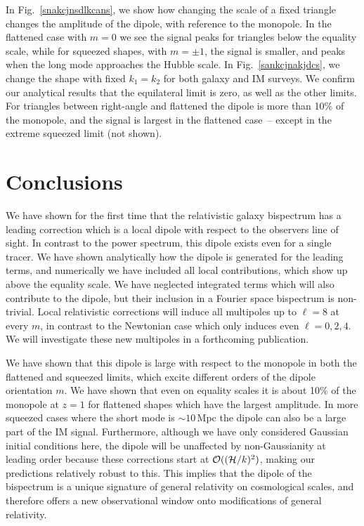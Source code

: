 In Fig.~\eqref{snakcjnsdlkcans}, we show how changing the scale of a fixed triangle changes the amplitude of the dipole, with reference to the monopole. In the flattened case with $m=0$ we see the signal peaks for triangles below the equality scale, while for squeezed shapes, with $m=\pm1$, the signal is smaller, and peaks when the long mode approaches the Hubble scale. 
In Fig.~\eqref{sankcjnakjdcs}, we change the shape with fixed $k_1=k_2$ for both galaxy and IM surveys. We confirm our analytical results that the equilateral limit is zero, as well as the other limits. For triangles between right-angle and flattened the dipole is more than 10\% of the monopole, and the signal is largest in the flattened case~-- except in the extreme squeezed limit (not shown). 

\section{Conclusions}

We have shown for the first time that the relativistic galaxy bispectrum has a leading correction which is a local dipole with respect to the observers line of sight. In contrast to the power spectrum, this dipole exists even for a single tracer. We have shown analytically how the dipole is generated for the leading terms, and numerically we have included all local contributions, which show up above the equality scale. We have neglected integrated terms which will also contribute to the dipole, but their inclusion in a Fourier space bispectrum is non-trivial. Local relativistic corrections will induce all multipoles up to $\ell=8$ at every $m$, in contrast to the Newtonian case which only induces even $\ell=0,2,4$. We will investigate these new multipoles in a forthcoming publication. 

We have shown that this dipole is large with respect to the monopole in both the flattened and squeezed limits, which excite different orders of the dipole orientation $m$.  We have shown that even on equality scales it is about 10\% of the monopole at $z=1$ for flattened shapes which have the largest amplitude. In more squeezed cases where the short mode is $\sim10$\,Mpc the dipole can also be a large part of the IM signal. Furthermore, although we have only considered Gaussian initial conditions here, the dipole will be unaffected by non-Gaussianity at leading order because these corrections start at $\mathcal{O}((\mathcal{H}/k)^2)$, making our predictions relatively robust to this. This implies that the dipole of the bispectrum is a unique signature of general relativity on cosmological scales, and therefore offers a new observational window onto modifications of general relativity. 




